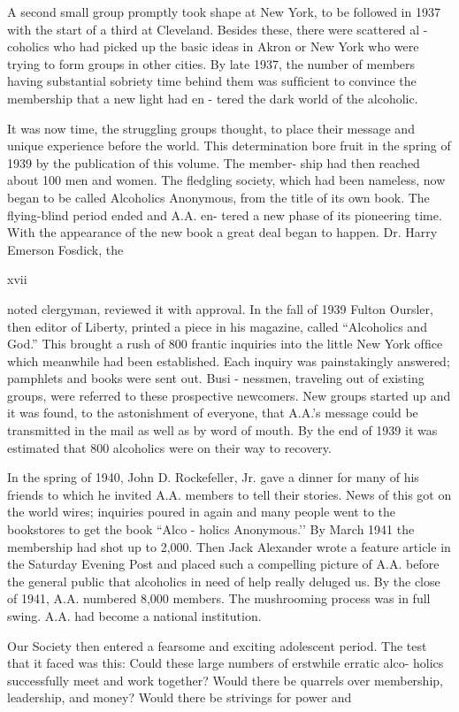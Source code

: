A second small group promptly took shape at New
York, to be followed in 1937 with the start of a third at
Cleveland. Besides these, there were scattered al -
coholics who had picked up the basic ideas in Akron or
New York who were trying to form groups in other
cities. By late 1937, the number of members having
substantial sobriety time behind them was sufﬁcient to
convince the membership that a new light had en -
tered the dark world of the alcoholic.

It was now time, the struggling groups thought, to
place their message and unique experience before the
world. This determination bore fruit in the spring of
1939 by the publication of this volume. The member-
ship had then reached about 100 men and women. The
ﬂedgling society, which had been nameless, now began
to be called Alcoholics Anonymous, from the title of its
own book. The ﬂying-blind period ended and A.A. en-
tered a new phase of its pioneering time.
With the appearance of the new book a great deal
began to happen. Dr. Harry Emerson Fosdick, the

xvii

noted clergyman, reviewed it with approval. In the
fall of 1939 Fulton Oursler, then editor of Liberty,
printed a piece in his magazine, called “Alcoholics and
God.” This brought a rush of 800 frantic inquiries
into the little New York ofﬁce which meanwhile had
been established. Each inquiry was painstakingly
 answered; pamphlets and books were sent out. Busi -
nessmen, traveling out of existing groups, were
 referred to these prospective newcomers. New groups
started up and it was found, to the astonishment of
everyone, that A.A.’s message could be transmitted in
the mail as well as by word of mouth. By the end of
1939 it was estimated that 800 alcoholics were on
their way to recovery.

In the spring of 1940, John D. Rockefeller, Jr. gave
a dinner for many of his friends to which he invited
A.A. members to tell their stories. News of this got on
the world wires; inquiries poured in again and many
people went to the bookstores to get the book “Alco -
holics Anonymous.’’ By March 1941 the membership
had shot up to 2,000. Then Jack Alexander wrote a
 feature article in the Saturday Evening Post and
placed such a compelling picture of A.A. before the
general public that alcoholics in need of help really
 deluged us. By the close of 1941, A.A. numbered 8,000
members. The mushrooming process was in full swing.
A.A. had become a national institution.

Our Society then entered a fearsome and exciting
adolescent period. The test that it faced was this:
Could these large numbers of erstwhile erratic alco-
holics successfully meet and work together? Would
there be quarrels over membership, leadership, and
money? Would there be strivings for power and

